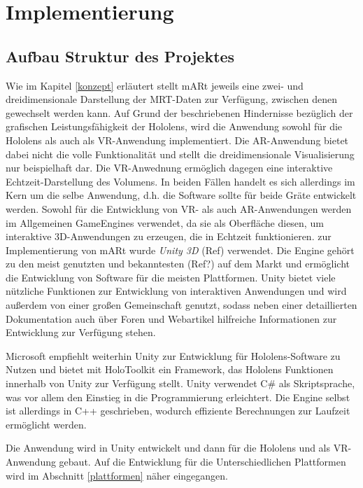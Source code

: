 
\chapter{Implementierung}
\label{implementierung}

\section{Aufbau Struktur des Projektes}

Wie im Kapitel \ref{konzept} erläutert stellt mARt jeweils eine zwei- und dreidimensionale Darstellung der MRT-Daten zur Verfügung, zwischen denen gewechselt werden kann. Auf Grund der beschriebenen Hindernisse bezüglich der grafischen Leistungsfähigkeit der Hololens, wird die Anwendung sowohl für die Hololens als auch als VR-Anwendung implementiert. Die AR-Anwendung bietet dabei nicht die volle Funktionalität und stellt die dreidimensionale Visualisierung nur beispielhaft dar. Die VR-Anwednung ermöglich dagegen eine interaktive Echtzeit-Darstellung des Volumens. In beiden Fällen handelt es sich allerdings im Kern um die selbe Anwendung, d.h. die Software sollte für beide Gräte entwickelt werden. 
Sowohl für die Entwicklung von VR- als auch AR-Anwendungen werden im Allgemeinen GameEngines verwendet, da sie als Oberfläche diesen, um interaktive 3D-Anwendungen zu erzeugen, die in Echtzeit funktionieren. 
zur Implementierung von mARt wurde \textit{Unity 3D} (Ref) verwendet. Die Engine gehört zu den meist genutzten und bekanntesten (Ref?) auf dem Markt und ermöglicht die Entwicklung von Software für die meisten Plattformen. Unity bietet viele nützliche Funktionen zur Entwicklung von interaktiven Anwendungen und wird außerdem von einer großen  Gemeinschaft genutzt, sodass neben einer detaillierten Dokumentation auch über Foren und Webartikel hilfreiche Informationen zur Entwicklung zur Verfügung stehen.

Microsoft empfiehlt weiterhin Unity zur Entwicklung für Hololens-Software zu Nutzen und bietet mit HoloToolkit ein Framework, das Hololens Funktionen innerhalb von Unity zur Verfügung stellt. 
Unity verwendet C\# als Skriptsprache, was vor allem den Einstieg in die Programmierung erleichtert. Die Engine selbst ist allerdings in C++ geschrieben, wodurch effiziente Berechnungen zur Laufzeit ermöglicht werden.

Die Anwendung wird in Unity entwickelt und dann für die Hololens und als VR-Anwendung gebaut. Auf die Entwicklung für die Unterschiedlichen Plattformen wird im Abschnitt \ref{plattformen} näher eingegangen.

